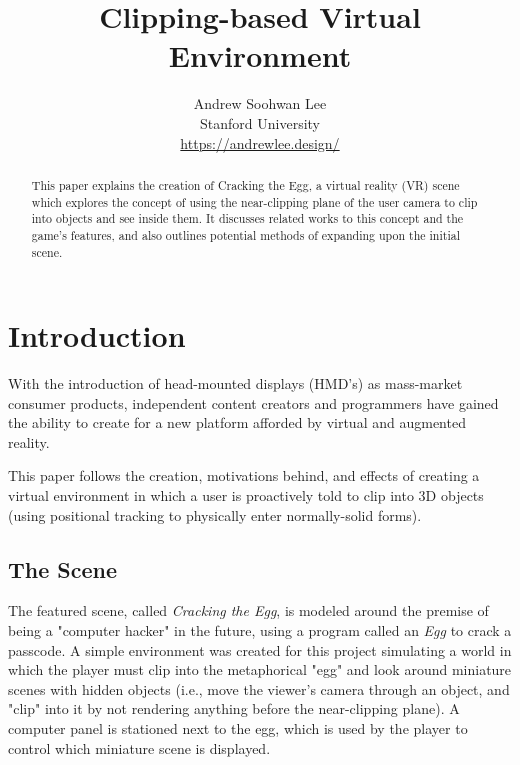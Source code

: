 \documentclass[10pt,twocolumn,letterpaper]{article}
\begin{document}
\title{Clipping-based Virtual Environment}

\author{Andrew Soohwan Lee\\
Stanford University\\
{\small\url{https://andrewlee.design/}}
}

\maketitle
\thispagestyle{empty}

\begin{abstract}
This paper explains the creation of \textnormal{Cracking the Egg}, a virtual reality (VR) scene which explores the concept of using the near-clipping plane of the user camera to clip into objects and see inside them. It discusses related works to this concept and the game's features, and also outlines potential methods of expanding upon the initial scene.\\
\end{abstract}

\section{Introduction} \label{introduction}

With the introduction of head-mounted displays (HMD's) as mass-market consumer products, independent content creators and programmers have gained the ability to create for a new platform afforded by virtual and augmented reality.

This paper follows the creation, motivations behind, and effects of creating a virtual environment in which a user is proactively told to clip into 3D objects (using positional tracking to physically enter normally-solid forms).

\subsection{The Scene}

The featured scene, called \textit{Cracking the Egg}, is modeled around the premise of being a "computer hacker" in the future, using a program called an \textit{Egg} to crack a passcode. A simple environment was created for this project simulating a world in which the player must clip into the metaphorical "egg" and look around miniature scenes with hidden objects (i.e., move the viewer's camera through an object, and "clip" into it by not rendering anything before the near-clipping plane). A computer panel is stationed next to the egg, which is used by the player to control which miniature scene is displayed.
\end{document}
